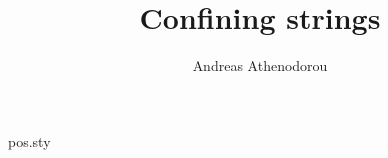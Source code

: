 \begin{filecontents*}{pos.sty}
\newcommand\FullConference[1]{\gdef\FullConference@box{\vbox{\small\raggedright\it #1}}}
\newtoks\affil@toks\newif\ifaffil\affilfalse
\newcommand{\affiliation}[2][]{\affiltrue
  \if!#1!\affil@toks=\expandafter{\the\affil@toks{\item[]#2}}%
  \else\affil@toks=\expandafter{\the\affil@toks{\item[$^{#1}$]#2}}\fi}
\newtoks\email@toks{}%
\newcommand{\emailAdd}[1]{\emailaddtrue%
  \ifnum\theemail@counter>0\email@toks=\expandafter{\the\email@toks, \@email{#1}}%
  \else\email@toks=\expandafter{\the\email@toks\@email{#1}}\fi\stepcounter{email@counter}}
\newcommand{\@email}[1]{\href{mailto:#1}{#1}}
\renewcommand\maketitle{\begingroup
  \begin{flushleft}
    {\LARGE\bfseries \@title\par}\medskip
    {\bfseries \printAuthors\par}
    \ifaffil\begin{list}{}{}\itshape\small\the\affil@toks\end{list}\fi
    \ifemailadd\textit{E-mail:} {\ttfamily\small\the\email@toks}\par\fi
    \if!\@abstract!\else\parbox{.9\textwidth}{\small\@abstract}\par\fi
    \FullConference@box
  \end{flushleft}
  \endgroup\setcounter{footnote}{0}}
\end{filecontents*}
\documentclass{report}
\usepackage{pos}
\title{Confining strings}
\author{Andreas Athenodorou}

\maketitle
Body.

